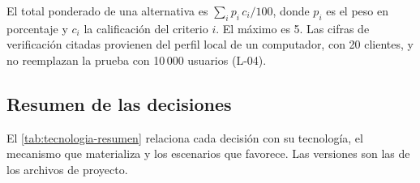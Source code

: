 El total ponderado de una alternativa es $\sum_i p_i \, c_i / 100$, donde $p_i$ es el peso en porcentaje y $c_i$ la calificación del criterio $i$.
El máximo es 5.
Las cifras de verificación citadas provienen del perfil local de un computador, con 20 clientes, y no reemplazan la prueba con 10\,000 usuarios (L-04).

\subsection{Resumen de las decisiones}
\label{sec:tec-resumen}

El \cref{tab:tecnologia-resumen} relaciona cada decisión con su tecnología, el mecanismo que materializa y los escenarios que favorece.
Las versiones son las de los archivos de proyecto.

\begingroup\small
